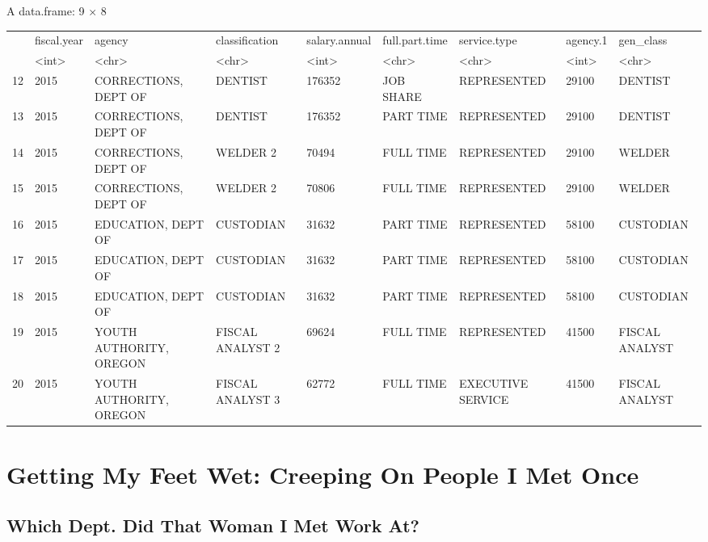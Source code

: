 \documentclass[11pt]{article}
\begin{document}
    A data.frame: 9 × 8
\begin{tabular}{r|llllllll}
  & fiscal.year & agency & classification & salary.annual & full.part.time & service.type & agency.1 & gen\_class\\
  & <int> & <chr> & <chr> & <int> & <chr> & <chr> & <int> & <chr>\\
\hline
	12 & 2015 & CORRECTIONS, DEPT OF    & DENTIST          & 176352 & JOB SHARE & REPRESENTED       & 29100 & DENTIST       \\
	13 & 2015 & CORRECTIONS, DEPT OF    & DENTIST          & 176352 & PART TIME & REPRESENTED       & 29100 & DENTIST       \\
	14 & 2015 & CORRECTIONS, DEPT OF    & WELDER 2         &  70494 & FULL TIME & REPRESENTED       & 29100 & WELDER        \\
	15 & 2015 & CORRECTIONS, DEPT OF    & WELDER 2         &  70806 & FULL TIME & REPRESENTED       & 29100 & WELDER        \\
	16 & 2015 & EDUCATION, DEPT OF      & CUSTODIAN        &  31632 & PART TIME & REPRESENTED       & 58100 & CUSTODIAN     \\
	17 & 2015 & EDUCATION, DEPT OF      & CUSTODIAN        &  31632 & PART TIME & REPRESENTED       & 58100 & CUSTODIAN     \\
	18 & 2015 & EDUCATION, DEPT OF      & CUSTODIAN        &  31632 & PART TIME & REPRESENTED       & 58100 & CUSTODIAN     \\
	19 & 2015 & YOUTH AUTHORITY, OREGON & FISCAL ANALYST 2 &  69624 & FULL TIME & REPRESENTED       & 41500 & FISCAL ANALYST\\
	20 & 2015 & YOUTH AUTHORITY, OREGON & FISCAL ANALYST 3 &  62772 & FULL TIME & EXECUTIVE SERVICE & 41500 & FISCAL ANALYST\\
\end{tabular}


    
    \hypertarget{getting-my-feet-wet-creeping-on-people-i-met-once}{%
\section{Getting My Feet Wet: Creeping On People I Met
Once}\label{getting-my-feet-wet-creeping-on-people-i-met-once}}

\hypertarget{which-dept.-did-that-woman-i-met-work-at}{%
\subsection{Which Dept. Did That Woman I Met Work
At?}\label{which-dept.-did-that-woman-i-met-work-at}}
\end{document}
